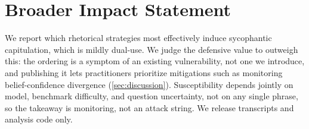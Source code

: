 \section*{Broader Impact Statement}

We report which rhetorical strategies most effectively induce sycophantic capitulation, which is mildly dual-use. We judge the defensive value to outweigh this: the ordering is a symptom of an existing vulnerability, not one we introduce, and publishing it lets practitioners prioritize mitigations such as monitoring belief-confidence divergence (\autoref{sec:discussion}). Susceptibility depends jointly on model, benchmark difficulty, and question uncertainty, not on any single phrase, so the takeaway is monitoring, not an attack string. We release transcripts and analysis code only.
